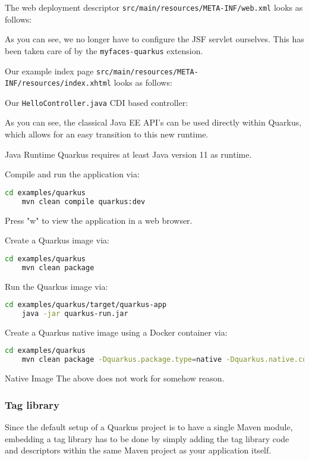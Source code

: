 The web deployment descriptor \texttt{src/main/resources/META-INF/web.xml} looks as follows:

As you can see, we no longer have to configure the JSF servlet ourselves.
This has been taken care of by the \texttt{myfaces-quarkus} extension.

Our example index page \texttt{src/main/resources/META-INF/resources/index.xhtml} looks as follows:


Our \texttt{HelloController.java} CDI based controller:

As you can see, the classical Java EE API's can be used directly within Quarkus, which allows for an easy transition to this new runtime.

\begin{TIP}{Java Runtime}
	Quarkus requires at least Java version 11 as runtime.
\end{TIP}

Compile and run the application via:
\begin{lstlisting}[language=bash]
	cd examples/quarkus
	mvn clean compile quarkus:dev
\end{lstlisting}
Press "w" to view the application in a web browser.

Create a Quarkus image via:
\begin{lstlisting}[language=bash]
	cd examples/quarkus
	mvn clean package
\end{lstlisting}
Run the Quarkus image via:
\begin{lstlisting}[language=bash]
	cd examples/quarkus/target/quarkus-app
	java -jar quarkus-run.jar
\end{lstlisting}
Create a Quarkus native image using a Docker container via:
\begin{lstlisting}[language=bash]
	cd examples/quarkus
	mvn clean package -Dquarkus.package.type=native -Dquarkus.native.container-build=true
\end{lstlisting}
\begin{TODO}{Native Image}
The above does not work for somehow reason.
\end{TODO}

\subsubsection{Tag library}
Since the default setup of a Quarkus project is to have a single Maven module,
embedding a tag library has to be done by simply adding the tag library code and descriptors within the same Maven project as your application itself.


